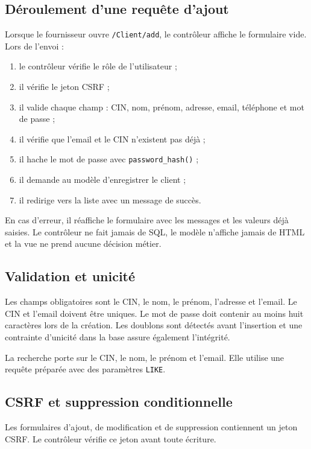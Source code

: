 \subsection{Déroulement d'une requête d'ajout}

Lorsque le fournisseur ouvre \texttt{/Client/add}, le contrôleur affiche le formulaire vide. Lors de l'envoi :

\begin{enumerate}[leftmargin=*]
  \item le contrôleur vérifie le rôle de l'utilisateur ;
  \item il vérifie le jeton CSRF ;
  \item il valide chaque champ : CIN, nom, prénom, adresse, email, téléphone et mot de passe ;
  \item il vérifie que l'email et le CIN n'existent pas déjà ;
  \item il hache le mot de passe avec \texttt{password\_hash()} ;
  \item il demande au modèle d'enregistrer le client ;
  \item il redirige vers la liste avec un message de succès.
\end{enumerate}

En cas d'erreur, il réaffiche le formulaire avec les messages et les valeurs déjà saisies. Le contrôleur ne fait jamais de SQL, le modèle n'affiche jamais de HTML et la vue ne prend aucune décision métier.

\subsection{Validation et unicité}

Les champs obligatoires sont le CIN, le nom, le prénom, l'adresse et l'email. Le CIN et l'email doivent être uniques. Le mot de passe doit contenir au moins huit caractères lors de la création. Les doublons sont détectés avant l'insertion et une contrainte d'unicité dans la base assure également l'intégrité.

La recherche porte sur le CIN, le nom, le prénom et l'email. Elle utilise une requête préparée avec des paramètres \texttt{LIKE}.

\subsection{CSRF et suppression conditionnelle}

Les formulaires d'ajout, de modification et de suppression contiennent un jeton CSRF. Le contrôleur vérifie ce jeton avant toute écriture.

